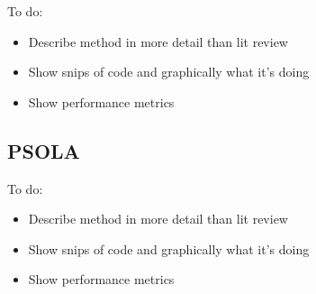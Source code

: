 \color{red}
To do:
\begin{itemize}
	\item Describe method in more detail than lit review
	\item Show snips of code and graphically what it's doing
	\item Show performance metrics
\end{itemize}
\color{black}

\subsection{PSOLA}

\color{red}
To do:
\begin{itemize}
	\item Describe method in more detail than lit review
	\item Show snips of code and graphically what it's doing
	\item Show performance metrics
\end{itemize}
\color{black}
